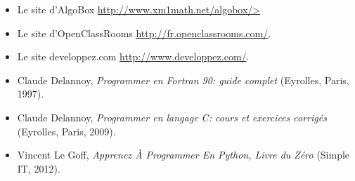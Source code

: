 \begin{itemize}
    \item Le site d'AlgoBox \url{http://www.xm1math.net/algobox/>}
    \item Le site d'OpenClassRooms \url{http://fr.openclassrooms.com/}.
    \item Le site developpez.com \url{http://www.developpez.com/}.
    \item Claude Delannoy, \textit{Programmer en Fortran 90: guide complet} (Eyrolles, Paris, 1997).
    \item Claude Delannoy, \textit{Programmer en langage C: cours et exercices corrigés} (Eyrolles, Paris, 2009).
    \item Vincent Le Goff, \textit{Apprenez À Programmer En Python, Livre du Zéro} (Simple IT, 2012).
\end{itemize}

